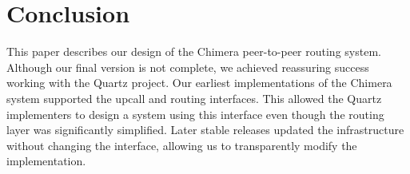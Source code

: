 \section{Conclusion}
\label{conclusion}

This paper describes our design of the Chimera peer-to-peer routing system.
Although our final version is not complete, we achieved reassuring success
working with the Quartz project. Our earliest implementations of the 
Chimera system supported the upcall and routing interfaces. This allowed the
Quartz implementers to design a system using this interface even though the
routing layer was significantly simplified. Later stable releases updated
the infrastructure without changing the interface, allowing us to transparently
modify the implementation.

